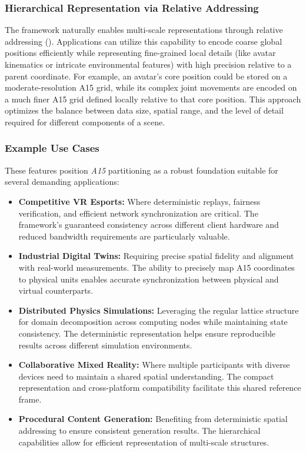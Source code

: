 \documentclass[10pt]{article}
\def\AAAB{\textit{A15}}
\begin{document}
\subsubsection{Hierarchical Representation via Relative Addressing}\label{subsubsec-apps-relative}
The framework naturally enables multi-scale representations through relative addressing (). Applications can utilize this capability to encode coarse global positions efficiently while representing fine-grained local details (like avatar kinematics or intricate environmental features) with high precision relative to a parent coordinate. For example, an avatar's core position could be stored on a moderate-resolution A15 grid, while its complex joint movements are encoded on a much finer A15 grid defined locally relative to that core position. This approach optimizes the balance between data size, spatial range, and the level of detail required for different components of a scene.

\subsubsection{Example Use Cases}\label{subsubsec-apps-usecases}
These features position \AAAB{} partitioning as a robust foundation suitable for several demanding applications:

\begin{itemize} \itemsep0pt
    \item \textbf{Competitive VR Esports:} Where deterministic replays, fairness verification, and efficient network synchronization are critical. The framework's guaranteed consistency across different client hardware and reduced bandwidth requirements are particularly valuable.

    \item \textbf{Industrial Digital Twins:} Requiring precise spatial fidelity and alignment with real-world measurements. The ability to precisely map A15 coordinates to physical units enables accurate synchronization between physical and virtual counterparts.

    \item \textbf{Distributed Physics Simulations:} Leveraging the regular lattice structure for domain decomposition across computing nodes while maintaining state consistency. The deterministic representation helps ensure reproducible results across different simulation environments.

    \item \textbf{Collaborative Mixed Reality:} Where multiple participants with diverse devices need to maintain a shared spatial understanding. The compact representation and cross-platform compatibility facilitate this shared reference frame.

    \item \textbf{Procedural Content Generation:} Benefiting from deterministic spatial addressing to ensure consistent generation results. The hierarchical capabilities allow for efficient representation of multi-scale structures.
\end{itemize}
\end{document}
